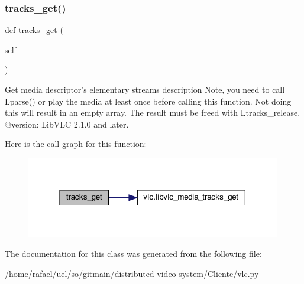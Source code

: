 \subsubsection{\texorpdfstring{tracks\+\_\+get()}{tracks\_get()}}
{\footnotesize\ttfamily def tracks\+\_\+get (\begin{DoxyParamCaption}\item[{}]{self }\end{DoxyParamCaption})}

\begin{DoxyVerb}Get media descriptor's elementary streams description
Note, you need to call L{parse}() or play the media at least once
before calling this function.
Not doing this will result in an empty array.
The result must be freed with L{tracks_release}.
@version: LibVLC 2.1.0 and later.
\end{DoxyVerb}
 Here is the call graph for this function\+:
\nopagebreak
\begin{figure}[H]
\begin{center}
\leavevmode
\includegraphics[width=315pt]{classvlc_1_1_media_a63becd5b42e2d084abff82ae94d284ba_cgraph}
\end{center}
\end{figure}


The documentation for this class was generated from the following file\+:\begin{DoxyCompactItemize}
\item 
/home/rafael/uel/so/gitmain/distributed-\/video-\/system/\+Cliente/\hyperlink{vlc_8py}{vlc.\+py}\end{DoxyCompactItemize}
